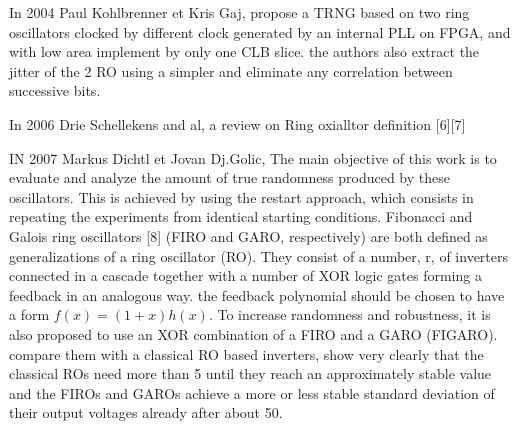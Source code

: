 In 2004 Paul Kohlbrenner et Kris Gaj, propose a TRNG based on two ring oscillators clocked by different clock generated by an internal PLL on FPGA, and with low area implement by only one CLB slice. the authors also extract the jitter of the 2 RO using a simpler and eliminate any correlation between successive bits.

In 2006 Drie Schellekens and al, a review on Ring oxialltor definition [6][7]

IN 2007 Markus Dichtl et Jovan Dj.Golic, The main objective of this work is to evaluate and analyze the amount of true randomness produced by these oscillators. This is achieved by using the restart approach, which consists in repeating the experiments from identical starting conditions. Fibonacci and Galois ring oscillators [8] (FIRO and GARO, respectively) are both defined as generalizations of a ring oscillator (RO). They consist of a number, r, of inverters connected in a cascade together with a number of XOR logic gates forming a feedback in an analogous way. the feedback polynomial should be chosen to have a form $f(x) = (1+x)h(x)$. To increase randomness and robustness, it is also proposed to use an
XOR combination of a FIRO and a GARO (FIGARO). compare them with a classical RO based inverters, show very clearly that the classical ROs need more than 5 until they reach an approximately stable value and the FIROs and GAROs achieve a more or less stable standard deviation of their output voltages already after about 50.

